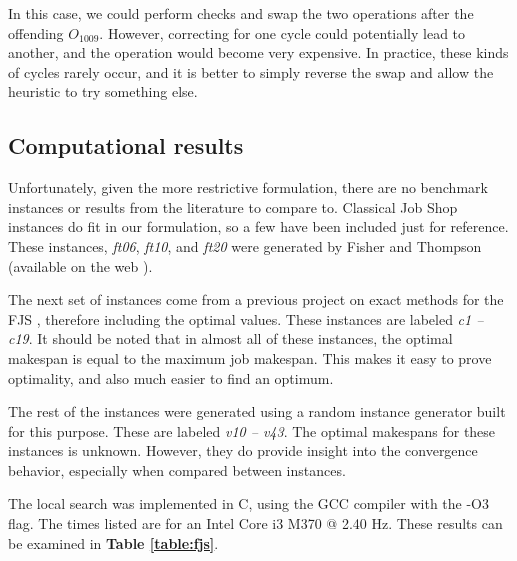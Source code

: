 \documentclass[a4paper,10pt]{article}
\begin{document}
In this case, we could perform checks and swap the two operations after the offending $O_{1009}$. However, correcting for one cycle could potentially lead to another, and the operation would become very expensive. In practice, these kinds of cycles rarely occur, and it is better to simply reverse the swap and allow the heuristic to try something else.

\subsection{Computational results}

Unfortunately, given the more restrictive formulation, there are no benchmark instances or results from the literature to compare to. Classical Job Shop instances do fit in our formulation, so a few have been included just for reference. These instances, \emph{ft06}, \emph{ft10}, and \emph{ft20} were generated by Fisher and Thompson (available on the web \cite{jobshopinfo}).

The next set of instances come from a previous project on exact methods for the FJS \cite{cijvat}, therefore including the optimal values. These instances are labeled \emph{c1 -- c19}. It should be noted that in almost all of these instances, the optimal makespan is equal to the maximum job makespan. This makes it easy to prove optimality, and also much easier to find an optimum.

The rest of the instances were generated using a random instance generator built for this purpose. These are labeled \emph{v10 -- v43}. The optimal makespans for these instances is unknown. However, they do provide insight into the convergence behavior, especially when compared between instances.

The local search was implemented in C, using the GCC compiler with the -O3 flag. The times listed are for an Intel Core i3 M370 @ 2.40 Hz. These results can be examined in \textbf{Table \ref{table:fjs}}.
\end{document}
